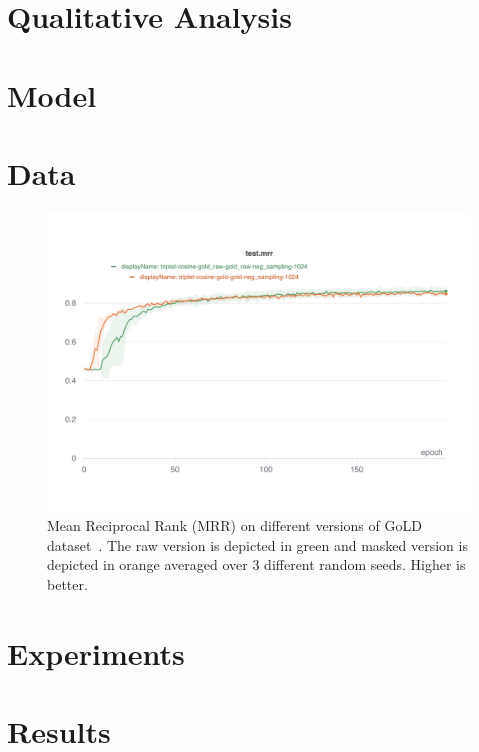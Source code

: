 \documentclass[sigconf,natbib=true,anonymous=true]{acmart}
\begin{document}
\appendix
\label{sec:appendix}


\section{Qualitative Analysis}
\section{Model}


\section{Data}

\begin{figure}[tbh]
\centering
\includegraphics[width=2.0\columnwidth]{Figures/raw-mask-test-mrr.pdf}
\caption{Mean Reciprocal Rank (MRR) on different versions of GoLD dataset~\cite{GoLD_UMBC}. The raw version is depicted in green and masked version is depicted in orange averaged over 3 different random seeds. Higher is better.}
\label{fig:mask-vs-raw}
\end{figure}

\section{Experiments}

\section{Results}
\end{document}
